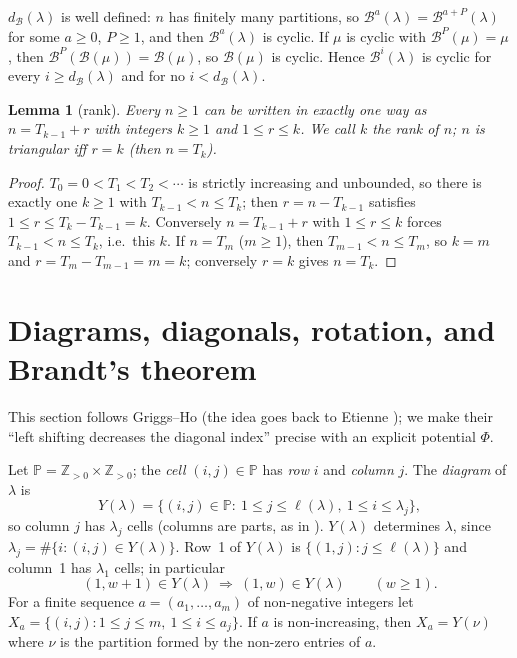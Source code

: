 \documentclass[11pt]{article}
\newtheorem{lemma}[theorem]{Lemma}
\theoremstyle{definition}
\newcommand{\Z}{\mathbb{Z}}
\newcommand{\PP}{\mathbb{P}}
\newcommand{\B}{\mathcal{B}}
\newcommand{\dB}{d_{\mathcal{B}}}
\renewcommand{\le}{\leqslant}
\renewcommand{\ge}{\geqslant}
\begin{document}
$\dB(\lambda)$ is well defined: $n$ has finitely many partitions, so $\B^a(\lambda)=\B^{a+P}(\lambda)$
for some $a\ge 0$, $P\ge 1$, and then $\B^a(\lambda)$ is cyclic.
If $\mu$ is cyclic with $\B^P(\mu)=\mu$, then $\B^P(\B(\mu))=\B(\mu)$, so $\B(\mu)$ is cyclic.
Hence $\B^i(\lambda)$ is cyclic for every $i\ge\dB(\lambda)$ and for no $i<\dB(\lambda)$.

\begin{lemma}[rank]\label{lem:rank}
Every $n\ge1$ can be written in exactly one way as $n=T_{k-1}+r$ with integers $k\ge1$ and
$1\le r\le k$.  We call $k$ the \emph{rank} of $n$; $n$ is triangular iff $r=k$ (then $n=T_k$).
\end{lemma}
\begin{proof}
$T_0=0<T_1<T_2<\cdots$ is strictly increasing and unbounded, so there is exactly one $k\ge 1$ with
$T_{k-1}<n\le T_k$; then $r=n-T_{k-1}$ satisfies $1\le r\le T_k-T_{k-1}=k$.
Conversely $n=T_{k-1}+r$ with $1\le r\le k$ forces $T_{k-1}<n\le T_k$, i.e.\ this $k$.
If $n=T_m$ ($m\ge1$), then $T_{m-1}<n\le T_m$, so $k=m$ and $r=T_m-T_{m-1}=m=k$; conversely $r=k$ gives
$n=T_k$.
\end{proof}

\section{Diagrams, diagonals, rotation, and Brandt's theorem}\label{sec:brandt}

This section follows Griggs--Ho \cite[\S2]{GH} (the idea goes back to Etienne \cite{Et});
we make their ``left shifting decreases the diagonal index'' precise with an explicit
potential $\Phi$.

Let $\PP=\Z_{>0}\times\Z_{>0}$; the \emph{cell} $(i,j)\in\PP$ has \emph{row} $i$ and \emph{column} $j$.
The \emph{diagram} of $\lambda$ is
\[Y(\lambda)=\{(i,j)\in\PP:\ 1\le j\le\ell(\lambda),\ 1\le i\le\lambda_j\},\]
so column $j$ has $\lambda_j$ cells (columns are parts, as in \cite{GH}).
$Y(\lambda)$ determines $\lambda$, since $\lambda_j=\#\{i:(i,j)\in Y(\lambda)\}$.
Row~1 of $Y(\lambda)$ is $\{(1,j):j\le\ell(\lambda)\}$ and column~1 has $\lambda_1$ cells; in particular
\begin{equation}\label{eq:Y1}
(1,w+1)\in Y(\lambda)\ \Longrightarrow\ (1,w)\in Y(\lambda)\qquad(w\ge1).
\end{equation}
For a finite sequence $a=(a_1,\dots,a_m)$ of non-negative integers let
$X_a=\{(i,j):1\le j\le m,\ 1\le i\le a_j\}$.  If $a$ is non-increasing, then $X_a=Y(\nu)$ where $\nu$ is the
partition formed by the non-zero entries of $a$.
\end{document}
